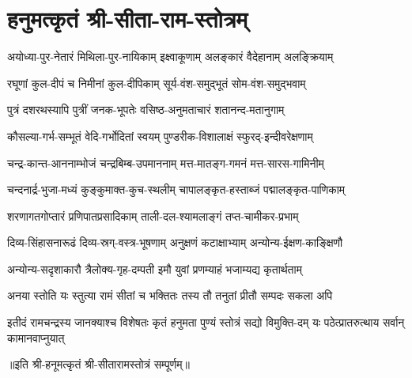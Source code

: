 
\section{हनुमत्कृतं श्री-सीता-राम-स्तोत्रम्}

\twolineshloka
{अयोध्या-पुर-नेतारं मिथिला-पुर-नायिकाम्}
{इक्ष्वाकूणाम् अलङ्कारं वैदेहानाम् अलङ्क्रियाम्} %

\twolineshloka
{रघूणां कुल-दीपं च निमीनां कुल-दीपिकाम्}
{सूर्य-वंश-समुद्भूतं सोम-वंश-समुद्भवाम्} %

\twolineshloka
{पुत्रं दशरथस्यापि पुत्रीं जनक-भूपतेः}
{वसिष्ठ-अनुमताचारं शतानन्द-मतानुगाम्} %

\twolineshloka
{कौसल्या-गर्भ-सम्भूतं वेदि-गर्भोदितां स्वयम्}
{पुण्डरीक-विशालाक्षं स्फुरद्-इन्दीवरेक्षणाम्} %

\twolineshloka
{चन्द्र-कान्त-आननाम्भोजं चन्द्रबिम्ब-उपमाननाम्}
{मत्त-मातङ्ग-गमनं मत्त-सारस-गामिनीम्}

\twolineshloka
{चन्दनार्द्र-भुजा-मध्यं कुङ्कुमाक्त-कुच-स्थलीम्}
{चापालङ्कृत-हस्ताब्जं पद्मालङ्कृत-पाणिकाम्} %

\twolineshloka
{शरणागतगोप्तारं प्रणिपातप्रसादिकाम्}
{ताली-दल-श्यामलाङ्गं तप्त-चामीकर-प्रभाम्} %

\twolineshloka
{दिव्य-सिंहासनारूढं दिव्य-स्रग्-वस्त्र-भूषणाम्} %
{अनुक्षणं कटाक्षाभ्याम् अन्योन्य-ईक्षण-काङ्क्षिणौ}

\twolineshloka
{अन्योन्य-सदृशाकारौ त्रैलोक्य-गृह-दम्पती}
{इमौ युवां प्रणम्याहं भजाम्यद्य कृतार्थताम्} %

\twolineshloka
{अनया स्तोति यः स्तुत्या रामं सीतां च भक्तितः}
{तस्य तौ तनुतां प्रीतौ सम्पदः सकला अपि} %

\threelineshloka
{इतीदं रामचन्द्रस्य जानक्याश्च विशेषतः}
{कृतं हनुमता पुण्यं स्तोत्रं सद्यो विमुक्ति-दम्}
{यः पठेत्प्रातरुत्थाय सर्वान् कामानवाप्नुयात्} %

॥इति श्री-हनूमत्कृतं श्री-सीतारामस्तोत्रं सम्पूर्णम्॥
